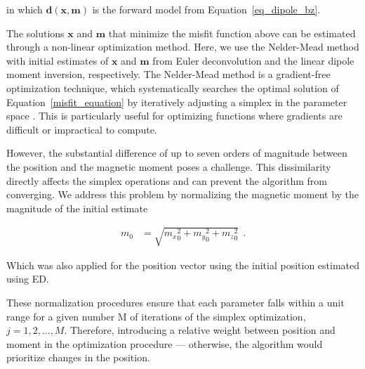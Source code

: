     \noindent
    in which $\mathbf{d}(\mathbf{x}, \mathbf{m})$ is the forward model from Equation~\ref{eq_dipole_bz}. 

    The solutions $\mathbf{x}$  and $\mathbf{m}$ that minimize the misfit function above can be estimated through a non-linear optimization method. 
    Here, we use the Nelder-Mead method \citep{Nelder-Mead1965,Gao2010} with initial estimates of $\mathbf{x}$ and $\mathbf{m}$ from Euler deconvolution and the linear dipole moment inversion, respectively.    
     The Nelder-Mead method is a gradient-free optimization technique, which systematically searches the optimal solution of Equation~\ref{misfit_equation} by iteratively adjusting a simplex in the parameter space \citep{Nelder-Mead1965}. This is particularly useful for optimizing functions where gradients are difficult or impractical to compute. 
     
     However, the substantial difference of up to seven orders of magnitude between the position and the magnetic moment poses a challenge. This dissimilarity directly affects the simplex operations and can prevent the algorithm from converging. We address this problem by normalizing the magnetic moment by the magnitude of the initial estimate
     
    \begin{align}
    \label{normalizing_m_parameters}
    m_0 &= \sqrt{{m_x}_0^2+{m_y}_0^2+{m_z}_0^2}\ %
    \ .
    \end{align}
     
\noindent
Which was also applied for the position vector using the initial position estimated using ED. %


\noindent
These normalization procedures ensure that each parameter falls within a unit range for a given number M of iterations of the simplex optimization, $j = 1,2,..., M$. Therefore, introducing a relative weight between position and moment in the optimization procedure — otherwise, the algorithm would prioritize changes in the position.
     

